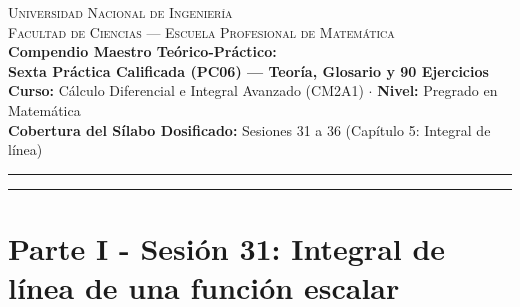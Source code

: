 \documentclass[11pt,a4paper]{article}
\begin{document}
\begin{center}
    {\large \scshape Universidad Nacional de Ingeniería}\\[0.15cm]
    {\large \scshape Facultad de Ciencias --- Escuela Profesional de Matemática}\\[0.35cm]
    {\LARGE \bfseries \color{navyblue} Compendio Maestro Teórico-Práctico:\\Sexta Práctica Calificada (PC06) --- Teoría, Glosario y 90 Ejercicios}\\[0.25cm]
    {\large \textbf{Curso:} Cálculo Diferencial e Integral Avanzado (CM2A1) \quad $\cdot$ \quad \textbf{Nivel:} Pregrado en Matemática}\\[0.2cm]
    {\small \textbf{Cobertura del Sílabo Dosificado:} Sesiones 31 a 36 (Capítulo 5: Integral de línea)}
\end{center}
\vspace{-0.2cm}
\hrule height 1.2pt
\vspace{0.4cm}

\begin{abstract}
Este compendio proporciona un desarrollo exhaustivo, riguroso y didáctico de los fundamentos teóricos necesarios para dominar el capítulo de Integrales de Línea, correspondiente a la \textbf{Sexta Práctica Calificada (PC06)} del curso CM2A1 de la Escuela Profesional de Matemática de la UNI. Se abordan las integrales de línea de funciones escalares y campos vectoriales, la caracterización topológica y analítica de campos gradientes (conservativos), la independencia de la trayectoria y los métodos para hallar funciones potenciales. Asimismo, se desarrolla con rigor el Teorema de Green en el plano para regiones simplemente y múltiplemente conexas, con un fuerte énfasis en sus aplicaciones topológicas y métricas (cálculo de áreas, trabajo y circulación). Se incluyen demostraciones formales de los principales resultados, ejemplos mínimos ilustrativos, ejercicios de nivel examen (PCs y Finales) resueltos analíticamente paso a paso sin omitir detalles, y una sección dedicada a desenmascarar errores frecuentes y trampas conceptuales típicas.
\end{abstract}

\tableofcontents
\vspace{0.5cm}
\hrule
\vspace{0.6cm}

\part*{Parte I - Sesión 31: Integral de línea de una función escalar}
\end{document}
